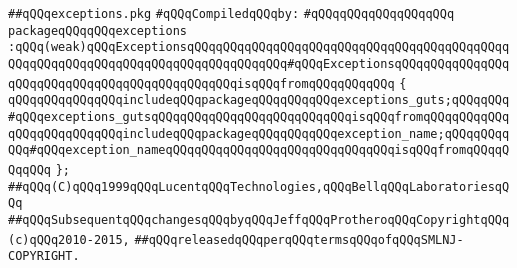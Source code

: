 \label{src/lib/std/exceptions.pkg}
\verb|##qQQqexceptions.pkg|\newline
\newline
\verb|#qQQqCompiledqQQqby:|\newline
\verb|#qQQqqQQqqQQqqQQqqQQq|\newline
\newline
\verb|packageqQQqqQQqexceptions|\newline
\verb|:qQQq(weak)qQQqExceptionsqQQqqQQqqQQqqQQqqQQqqQQqqQQqqQQqqQQqqQQqqQQqqQQqqQQqqQQqqQQqqQQqqQQqqQQqqQQqqQQqqQQq#qQQqExceptionsqQQqqQQqqQQqqQQqqQQqqQQqqQQqqQQqqQQqqQQqqQQqqQQqisqQQqfromqQQqqQQqqQQq|\newline
\verb|{|\newline
\verb|qQQqqQQqqQQqqQQqincludeqQQqpackageqQQqqQQqqQQqexceptions_guts;qQQqqQQq#qQQqexceptions_gutsqQQqqQQqqQQqqQQqqQQqqQQqqQQqisqQQqfromqQQqqQQqqQQq|\newline
\verb|qQQqqQQqqQQqqQQqincludeqQQqpackageqQQqqQQqqQQqexception_name;qQQqqQQqqQQq#qQQqexception_nameqQQqqQQqqQQqqQQqqQQqqQQqqQQqqQQqisqQQqfromqQQqqQQqqQQq|\newline
\verb|};|\newline
\newline
\newline
\verb|##qQQq(C)qQQq1999qQQqLucentqQQqTechnologies,qQQqBellqQQqLaboratoriesqQQq|\newline
\verb|##qQQqSubsequentqQQqchangesqQQqbyqQQqJeffqQQqProtheroqQQqCopyrightqQQq(c)qQQq2010-2015,|\newline
\verb|##qQQqreleasedqQQqperqQQqtermsqQQqofqQQqSMLNJ-COPYRIGHT.|\newline

